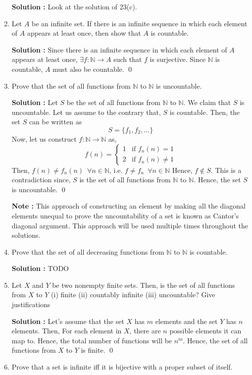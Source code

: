\documentclass[10pt]{article}
\newcommand{\nn}{\mathbb{N}}
\begin{document}
\begin{enumerate}
	    \textbf{Solution : } Look at the solution of 23(c).
    \item Let $A$ be an infinite set. If there is an infinite sequence in which each element of $A$ appears at least once, then show that $A$ is countable.
    
    \textbf{Solution : } Since there is an infinite sequence in which each element of $A$ appears at least once, $\exists f : \nn \to A$ such that $f$ is surjective. Since $\nn$ is countable, $A$ must also be countable. \qed    
    \item Prove that the set of all functions from $\nn$ to $\nn$ is uncountable.

    \textbf{Solution : }Let $S$ be the set of all functions from $\nn$ to $\nn$. We claim that $S$ is uncountable. Let us assume to the contrary that, $S$ is countable. Then, the set $S$ can be written as $$S = \{f_1, f_2, \dots \}$$ Now, let us construct $f : \nn \to \nn$ as, 
    \begin{equation*}
        f(n) = 
        \begin{cases}
            1 & \text{if } f_n(n) = 1 \\
            2 & \text{if } f_n(n) \neq 1
        \end{cases}
    \end{equation*}
    Then, $f(n) \neq f_n(n) \,\,\, \forall n \in \nn$, i.e. $f \neq f_n \,\,\, \forall n \in \nn$ Hence, $f \notin S$. This is a contradiction since, $S$ is the set of all functions from $\nn$ to $\nn$. Hence, the set $S$ is uncountable. \qed

    \textbf{Note : }This approach of constructing an element by making all the diagonal elements unequal  to prove the uncountability of a set is known as 
    Cantor's diagonal argument. This approach will be used multiple times throughout the solutions.
    \item Prove that the set of all decreasing functions from $\nn$ to $\nn$ is countable.

	    \textbf{ Solution : } TODO

    \item Let $X$ and $Y$ be two nonempty finite sets. Then, is the set of all functions from $X$ to $Y$ (i) finite (ii) countably infinite (iii) uncountable? Give justifications

	    \textbf{Solution : }Let's assume that the set $X$ has $m$ elements and the set $Y$ has $n$ elements. Then, For each element in $X$, there are $n$ possible elements it can map to. Hence, the total number of functions will be $n^m$. Hence, the set of all functions from $X$ to $Y$ is finite. \qed
    \item Prove that a set is infinite iff it is bijective with a proper subset of itself.


\end{enumerate}
\end{document}

